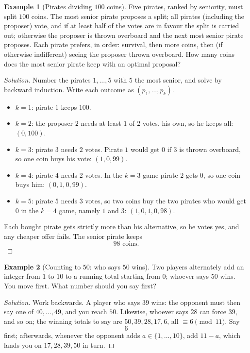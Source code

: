 \documentclass[11pt]{article}
\theoremstyle{definition}
\newtheorem{example}{Example}[section]
\begin{document}
\begin{example}[Pirates dividing $100$ coins]
Five pirates, ranked by seniority, must split $100$ coins. The most senior pirate proposes a split; all pirates (including the proposer) vote, and if at least half of the votes are in favour the split is carried out; otherwise the proposer is thrown overboard and the next most senior pirate proposes. Each pirate prefers, in order: survival, then more coins, then (if otherwise indifferent) seeing the proposer thrown overboard. How many coins does the most senior pirate keep with an optimal proposal?
\end{example}

\begin{proof}[Solution]
Number the pirates $1,\dots,5$ with $5$ the most senior, and solve by backward induction. Write each outcome as $(p_1,\dots,p_k)$.
\begin{itemize}
    \item $k=1$: pirate $1$ keeps $100$.
    \item $k=2$: the proposer $2$ needs at least $1$ of $2$ votes, his own, so he keeps all: $(0,100)$.
    \item $k=3$: pirate $3$ needs $2$ votes. Pirate $1$ would get $0$ if $3$ is thrown overboard, so one coin buys his vote: $(1,0,99)$.
    \item $k=4$: pirate $4$ needs $2$ votes. In the $k=3$ game pirate $2$ gets $0$, so one coin buys him: $(0,1,0,99)$.
    \item $k=5$: pirate $5$ needs $3$ votes, so two coins buy the two pirates who would get $0$ in the $k=4$ game, namely $1$ and $3$: $(1,0,1,0,98)$.
\end{itemize}
Each bought pirate gets strictly more than his alternative, so he votes yes, and any cheaper offer fails. The senior pirate keeps
\[
\boxed{98\text{ coins}}.
\]
\end{proof}

\begin{example}[Counting to $50$: who says $50$ wins]
Two players alternately add an integer from $1$ to $10$ to a running total starting from $0$; whoever says $50$ wins. You move first. What number should you say first?
\end{example}

\begin{proof}[Solution]
Work backwards. A player who says $39$ wins: the opponent must then say one of $40,\dots,49$, and you reach $50$. Likewise, whoever says $28$ can force $39$, and so on; the winning totals to say are $50,39,28,17,6$, all $\equiv 6\pmod{11}$. Say
\[
\boxed{6}
\]
first; afterwards, whenever the opponent adds $a\in\{1,\dots,10\}$, add $11-a$, which lands you on $17,28,39,50$ in turn.
\end{proof}
\end{document}
